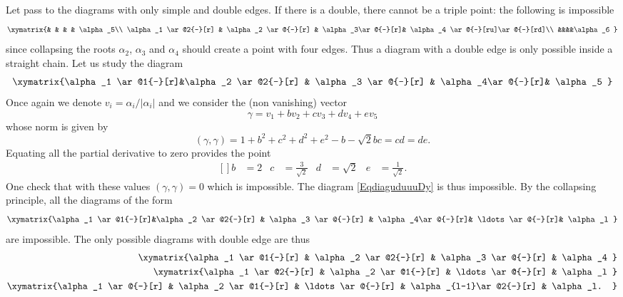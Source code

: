 Let pass to the diagrams with only simple and double edges. If there is a double, there cannot be a triple point: the following is impossible
\begin{equation}
	\xymatrix{%
		&                          &           &               &       \alpha_5\\
		\alpha_1 \ar@2{-}[r]   &    \alpha_2 \ar@{-}[r] & \alpha_3\ar@{-}[r]&  \alpha_4 \ar@{-}[ru]\ar@{-}[rd]\\
		&&&&\alpha_6
	}
\end{equation}
since collapsing the roots \( \alpha_2\), \( \alpha_3\) and \( \alpha_4\) should create a point with four edges. Thus a diagram with a double edge is only possible inside a straight chain. Let us study the diagram
\begin{equation}        \label{EqdiaguduuuDy}
	\xymatrix{%
		\alpha_1 \ar@1{-}[r]&\alpha_2  \ar@2{-}[r]   &    \alpha_3 \ar@{-}[r] & \alpha_4\ar@{-}[r]&  \alpha_5
	}
\end{equation}
Once again we denote \( v_i=\alpha_i/| \alpha_i |\) and we consider the (non vanishing) vector
\begin{equation}
	\gamma=v_1+bv_2+cv_3+dv_4+ev_5
\end{equation}
whose norm is given by
\begin{equation}
	(\gamma,\gamma)=1+b^2+c^2+d^2+e^2-b-\sqrt{2}bc=cd=de.
\end{equation}
Equating all the partial derivative to zero provides the point
\begin{equation}
	\begin{aligned}[]
		b & =2 & c & =\frac{ 3 }{ \sqrt{2} } & d & =\sqrt{2} & e & =\frac{1}{ \sqrt{2} }.
	\end{aligned}
\end{equation}
One check that with these values \( (\gamma,\gamma)=0\) which is impossible. The diagram \eqref{EqdiaguduuuDy} is thus impossible. By the collapsing principle, all the diagrams of the form
\begin{equation}
	\xymatrix{%
		\alpha_1 \ar@1{-}[r]&\alpha_2  \ar@2{-}[r]   &    \alpha_3 \ar@{-}[r] & \alpha_4\ar@{-}[r]& \ldots \ar@{-}[r]&  \alpha_l
	}
\end{equation}
are impossible. The only possible diagrams with double edge are thus
\begin{subequations}
	\begin{align}
		\xymatrix{%
		\alpha_1 \ar@1{-}[r] & \alpha_2  \ar@2{-}[r] & \alpha_3 \ar@{-}[r] & \alpha_4
		}                                                                                                        \\
		\xymatrix{%
		\alpha_1 \ar@2{-}[r] & \alpha_2  \ar@1{-}[r] & \ldots \ar@{-}[r]   & \alpha_l
		}    \label{subEqDynkdspds}                                                                              \\
		\xymatrix{%
		\alpha_1 \ar@{-}[r]  & \alpha_2  \ar@1{-}[r] & \ldots \ar@{-}[r]   & \alpha_{l-1}\ar@2{-}[r] & \alpha_l.
		}    \label{subEqdunksspd}
	\end{align}
\end{subequations}
